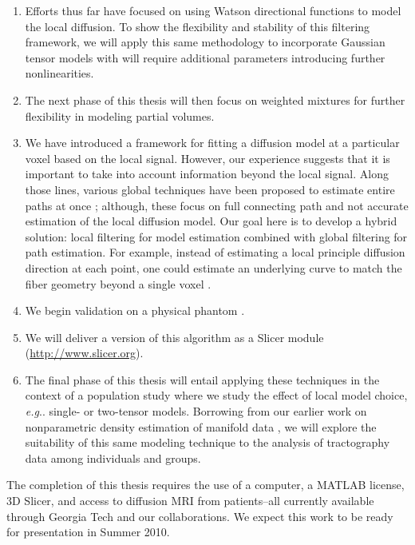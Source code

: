 \documentclass[letterpaper,hyperref,12pt]{gatech-thesis}
\makeatletter
\DeclareRobustCommand\onedot{\futurelet\@let@token\@onedot}
\def\@onedot{\ifx\@let@token.\else.\null\fi\xspace}
\newcommand{\eg}{\textit{e.g}\onedot}
\makeatother
\begin{document}
\begin{enumerate}
\item Efforts thus far have focused on using Watson directional functions to
  model the local diffusion.  To show the flexibility and stability of this
  filtering framework, we will apply this same methodology to incorporate
  Gaussian tensor models with will require additional parameters introducing
  further nonlinearities.

\item The next phase of this thesis will then focus on weighted mixtures for
  further flexibility in modeling partial volumes.

\item We have introduced a framework for fitting a diffusion model at a
  particular voxel based on the local signal.  However, our experience
  suggests that it is important to take into account information beyond the
  local signal.  Along those lines, various global techniques have been
  proposed to estimate entire paths at once
  \cite{Fillard2009,Reisert2009,Kreher2008}; although, these focus on full
  connecting path and not accurate estimation of the local diffusion model.
  Our goal here is to develop a hybrid solution:  local filtering for model
  estimation combined with global filtering for path estimation.  For example,
  instead of estimating a local principle diffusion direction at each point,
  one could estimate an underlying curve to match the fiber geometry beyond a
  single voxel \cite{Savadjiev2007}.

\item We begin validation on a physical phantom \cite{Poupon2008phantom}.

\item We will deliver a version of this algorithm as a Slicer module
  (\url{http://www.slicer.org}).

\item The final phase of this thesis will entail applying these techniques in
  the context of a population study where we study the effect of local model
  choice, \eg single- or two-tensor models.  Borrowing from our earlier work
  on nonparametric density estimation of manifold data \cite{Malcolm2007tc},
  we will explore the suitability of this same modeling technique to the
  analysis of tractography data among individuals and groups.
\end{enumerate}

The completion of this thesis requires the use of a computer, a MATLAB
license, 3D Slicer, and access to diffusion MRI from patients--all currently
available through Georgia Tech and our collaborations.  We expect this work to
be ready for presentation in Summer 2010.

\begin{postliminary}
\end{postliminary}
\end{document}
